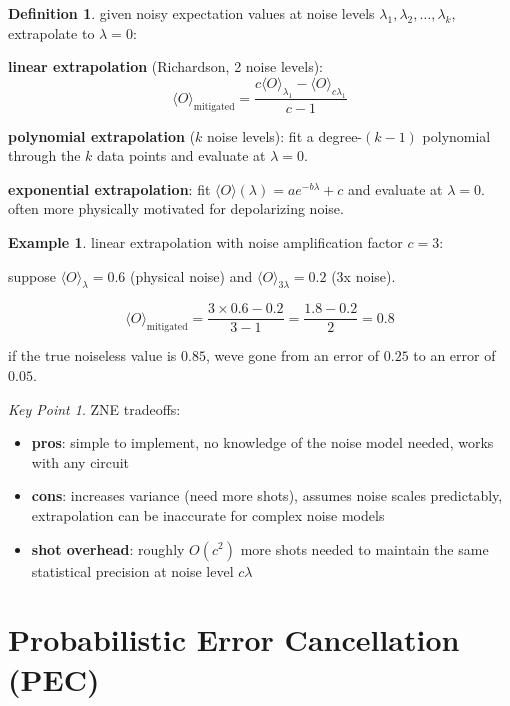 \documentclass[11pt,a4paper]{article}
\theoremstyle{definition}
\newtheorem{definition}{Definition}[section]
\newtheorem{example}{Example}[section]
\theoremstyle{remark}
\newtheorem*{keypoint}{Key Point}
\begin{document}
\begin{definition}
given noisy expectation values at noise levels $\lambda_1, \lambda_2, \ldots, \lambda_k$, extrapolate to $\lambda = 0$:

\textbf{linear extrapolation} (Richardson, 2 noise levels):
\[
\langle O \rangle_{\text{mitigated}} = \frac{c \langle O \rangle_{\lambda_1} - \langle O \rangle_{c\lambda_1}}{c - 1}
\]

\textbf{polynomial extrapolation} ($k$ noise levels): fit a degree-$(k-1)$ polynomial through the $k$ data points and evaluate at $\lambda = 0$.

\textbf{exponential extrapolation}: fit $\langle O \rangle(\lambda) = a e^{-b\lambda} + c$ and evaluate at $\lambda = 0$. often more physically motivated for depolarizing noise.
\end{definition}

\begin{example}
linear extrapolation with noise amplification factor $c = 3$:

suppose $\langle O \rangle_{\lambda} = 0.6$ (physical noise) and $\langle O \rangle_{3\lambda} = 0.2$ (3x noise).

\[
\langle O \rangle_{\text{mitigated}} = \frac{3 \times 0.6 - 0.2}{3 - 1} = \frac{1.8 - 0.2}{2} = 0.8
\]

if the true noiseless value is $0.85$, weve gone from an error of $0.25$ to an error of $0.05$.
\end{example}

\begin{keypoint}
ZNE tradeoffs:
\begin{itemize}
    \item \textbf{pros}: simple to implement, no knowledge of the noise model needed, works with any circuit
    \item \textbf{cons}: increases variance (need more shots), assumes noise scales predictably, extrapolation can be inaccurate for complex noise models
    \item \textbf{shot overhead}: roughly $O(c^2)$ more shots needed to maintain the same statistical precision at noise level $c\lambda$
\end{itemize}
\end{keypoint}

\section{Probabilistic Error Cancellation (PEC)}
\end{document}
